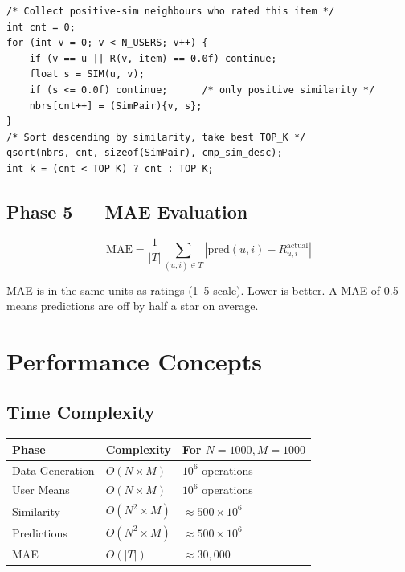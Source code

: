 \documentclass[12pt,a4paper]{article}
\begin{document}
\begin{lstlisting}
/* Collect positive-sim neighbours who rated this item */
int cnt = 0;
for (int v = 0; v < N_USERS; v++) {
    if (v == u || R(v, item) == 0.0f) continue;
    float s = SIM(u, v);
    if (s <= 0.0f) continue;      /* only positive similarity */
    nbrs[cnt++] = (SimPair){v, s};
}
/* Sort descending by similarity, take best TOP_K */
qsort(nbrs, cnt, sizeof(SimPair), cmp_sim_desc);
int k = (cnt < TOP_K) ? cnt : TOP_K;
\end{lstlisting}

\subsection{Phase 5 — MAE Evaluation}

\[
\text{MAE} = \frac{1}{|T|} \sum_{(u,i) \in T} |\text{pred}(u,i) - R_{u,i}^{\text{actual}}|
\]

MAE is in the same units as ratings (1–5 scale). Lower is better.
A MAE of 0.5 means predictions are off by half a star on average.

\section{Performance Concepts}

\subsection{Time Complexity}

\begin{center}
\begin{tabular}{lll}
\toprule
Phase & Complexity & For $N=1000, M=1000$ \\
\midrule
Data Generation & $O(N \times M)$ & $10^6$ operations \\
User Means      & $O(N \times M)$ & $10^6$ operations \\
Similarity      & $O(N^2 \times M)$ & $\approx 500 \times 10^6$ \\
Predictions     & $O(N^2 \times M)$ & $\approx 500 \times 10^6$ \\
MAE             & $O(|T|)$          & $\approx 30{,}000$ \\
\bottomrule
\end{tabular}
\end{center}
\end{document}
